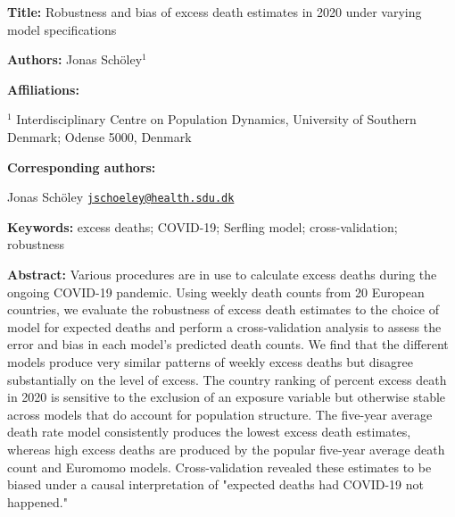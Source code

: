 \documentclass[12pt]{article}
\begin{document}
\begin{titlepage}

{\textbf{Title:}
Robustness and bias of excess death estimates in 2020 under varying model specifications
\par\medskip}

{\textbf{Authors:}
Jonas Schöley$^{1}$
\par\medskip}

{\textbf{Affiliations:}\par
$^1$ Interdisciplinary Centre on Population Dynamics, University of Southern Denmark; Odense 5000, Denmark\par
\par\medskip}

{\textbf{Corresponding authors:}\par
Jonas Schöley \href{mailto:jschoeley@health.sdu.dk}{\texttt{jschoeley@health.sdu.dk}}\par
\par\medskip}

{\textbf{Keywords:}
excess deaths; COVID-19; Serfling model; cross-validation; robustness
\par\medskip}

{\textbf{Abstract:}
Various procedures are in use to calculate excess deaths during the ongoing COVID-19 pandemic. Using weekly death counts from 20 European countries, we evaluate the robustness of excess death estimates to the choice of model for expected deaths and perform a cross-validation analysis to assess the error and bias in each model's predicted death counts. We find that the different models produce very similar patterns of weekly excess deaths but disagree substantially on the level of excess. The country ranking of percent excess death in 2020 is sensitive to the exclusion of an exposure variable but otherwise stable across models that do account for population structure. The five-year average death rate model consistently produces the lowest excess death estimates, whereas high excess deaths are produced by the popular five-year average death count and Euromomo models. Cross-validation revealed these estimates to be biased under a causal interpretation of "expected deaths had COVID-19 not happened."
\par\medskip}


\end{titlepage}
\end{document}
